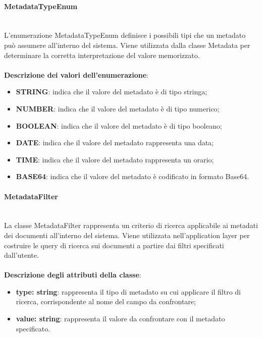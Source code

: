 \documentclass[a4paper,12pt]{article}
\begin{document}
{{{                \paragraph{MetadataTypeEnum}\label{par:MetadataTypeEnum}\mbox{}\\
                L'enumerazione MetadataTypeEnum definisce i possibili tipi che un metadato può assumere all'interno del sistema. Viene utilizzata dalla classe Metadata per determinare la corretta interpretazione del valore memorizzato.\\
                \\
                \textbf{Descrizione dei valori dell'enumerazione}:
                \begin{itemize}
                    \item \textbf{STRING}: indica che il valore del metadato è di tipo stringa;
                    \item \textbf{NUMBER}: indica che il valore del metadato è di tipo numerico;
                    \item \textbf{BOOLEAN}: indica che il valore del metadato è di tipo booleano;
                    \item \textbf{DATE}: indica che il valore del metadato rappresenta una data;
                    \item \textbf{TIME}: indica che il valore del metadato rappresenta un orario;
                    \item \textbf{BASE64}: indica che il valore del metadato è codificato in formato Base64.
                \end{itemize}
                \paragraph{MetadataFilter}\label{par:MetadataFilter}\mbox{}\\
                La classe MetadataFilter rappresenta un criterio di ricerca applicabile ai metadati dei documenti all'interno del sistema. Viene utilizzata nell'application layer per costruire le query di ricerca sui documenti a partire dai filtri specificati dall'utente.\\
                \\
                \textbf{Descrizione degli attributi della classe}:
                \begin{itemize}
                    \item \textbf{type: string}: rappresenta il tipo di metadato su cui applicare il filtro di ricerca, corrispondente al nome del campo da confrontare;
                    \item \textbf{value: string}: rappresenta il valore da confrontare con il metadato specificato.
                \end{itemize}
 
}}}
\end{document}

